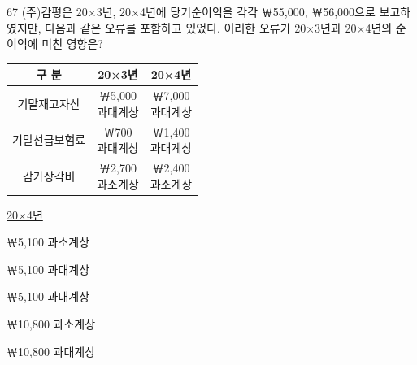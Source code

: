 \begin{question}{67}
(주)감평은 20×3년, 20×4년에 당기순이익을 각각 ￦55,000, ￦56,000으로 보고하였지만, 다음과 같은 오류를 포함하고 있었다. 이러한 오류가 20×3년과 20×4년의 순이익에 미친 영향은?

{\small\centering\begin{tabular}{|c|c|c|}\hline
구 분 & \uline{20×3년} & \uline{20×4년} \\ \hline
기말재고자산 & \makecell{￦5,000\\과대계상} & \makecell{￦7,000\\과대계상} \\ \hline
기말선급보험료 & \makecell{￦700\\과대계상} & \makecell{￦1,400\\과대계상} \\ \hline
감가상각비 & \makecell{￦2,700\\과소계상} & \makecell{￦2,400\\과소계상} \\ \hline
\end{tabular}\par}
\medskip

\noindent\hspace*{2em}\uline{20×4년}\par
\begin{choices}
  \item {}￦5,100 과소계상
  \item {}￦5,100 과대계상
  \item {}￦5,100 과대계상
  \item {}￦10,800 과소계상
  \item {}￦10,800 과대계상
\end{choices}
\end{question}
